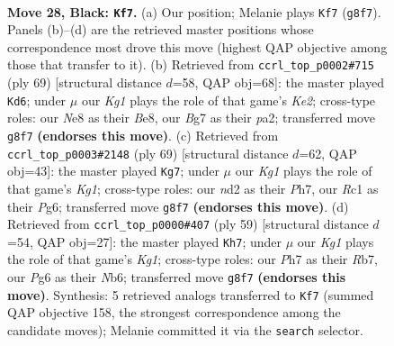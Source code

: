 \documentclass[11pt]{article}
\begin{document}
\clearpage

\begin{figure}[p]\centering
\begin{subfigure}{0.46\textwidth}\centering
\resizebox{\linewidth}{!}{%
\newchessgame
\chessboard[
  setfen={r3n1k1/P5bp/1pp3p1/5P2/4B1pP/R7/3NR2K/2r5 b - - 0 28},
  showmover=false,
  pgfstyle=straightmove, color=movearrow, markmove={g8-f7}
]}
\caption{}
\end{subfigure}\hfill
\begin{subfigure}{0.46\textwidth}\centering
\resizebox{\linewidth}{!}{%
\newchessgame
\chessboard[
  setfen={4b2r/r3k3/2p1p2P/3p4/p1P5/8/PP3R2/2KB3R b - - 0 35},
  showmover=false,
  pgfstyle=straightmove, color=movearrow, markmove={e7-d6}
]}
\caption{}
\end{subfigure}
\\[4pt]
\begin{subfigure}{0.46\textwidth}\centering
\resizebox{\linewidth}{!}{%
\newchessgame
\chessboard[
  setfen={4r1k1/1p5p/p5p1/2P1n3/7r/2P1R3/P3B2P/4R2K b - - 1 35},
  showmover=false,
  pgfstyle=straightmove, color=movearrow, markmove={g8-g7}
]}
\caption{}
\end{subfigure}\hfill
\begin{subfigure}{0.46\textwidth}\centering
\resizebox{\linewidth}{!}{%
\newchessgame
\chessboard[
  setfen={2r3k1/1r3pb1/1n4p1/7p/1p3P2/1B6/1PP2B1P/3R1R1K b - - 0 30},
  showmover=false,
  pgfstyle=straightmove, color=movearrow, markmove={g8-h7}
]}
\caption{}
\end{subfigure}
\caption{\textbf{Move 28, Black: \texttt{Kf7}.} (a) Our position; Melanie plays \texttt{Kf7} (\texttt{g8f7}). Panels (b)--(d) are the retrieved master positions whose correspondence most drove this move (highest QAP objective among those that transfer to it). (b) Retrieved from \texttt{ccrl\_top\_p0002\#715} (ply 69) [structural distance $d$=58, QAP obj=68]: the master played \texttt{Kd6}; under $\mu$ our \emph{Kg1} plays the role of that game's \emph{Ke2}; cross-type roles: our \emph{N}e8 as their \emph{B}e8, our \emph{B}g7 as their \emph{p}a2; transferred move \texttt{g8f7} \textbf{(endorses this move)}. (c) Retrieved from \texttt{ccrl\_top\_p0003\#2148} (ply 69) [structural distance $d$=62, QAP obj=43]: the master played \texttt{Kg7}; under $\mu$ our \emph{Kg1} plays the role of that game's \emph{Kg1}; cross-type roles: our \emph{n}d2 as their \emph{P}h7, our \emph{R}c1 as their \emph{P}g6; transferred move \texttt{g8f7} \textbf{(endorses this move)}. (d) Retrieved from \texttt{ccrl\_top\_p0000\#407} (ply 59) [structural distance $d$=54, QAP obj=27]: the master played \texttt{Kh7}; under $\mu$ our \emph{Kg1} plays the role of that game's \emph{Kg1}; cross-type roles: our \emph{P}h7 as their \emph{R}b7, our \emph{P}g6 as their \emph{N}b6; transferred move \texttt{g8f7} \textbf{(endorses this move)}. Synthesis: 5 retrieved analogs transferred to \texttt{Kf7} (summed QAP objective 158, the strongest correspondence among the candidate moves); Melanie committed it via the \texttt{search} selector.}
\label{fig:thought-m55}
\end{figure}
\end{document}
